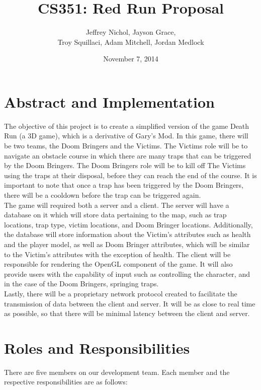 \documentclass[12pt, a4paper, oneside]{article}
\begin{document}
\title{CS351: Red Run Proposal}
\author{Jeffrey Nichol, Jayson Grace, \\
Troy Squillaci, Adam Mitchell, Jordan Medlock}
\date{November 7, 2014}
\maketitle

\section*{Abstract and Implementation}

The objective of this project is to create a simplified version of the game Death Run (a 3D game), which is a derivative of Gary's Mod. In this game, there will be two teams, the Doom Bringers and the Victims. The Victims role will be to navigate an obstacle course in which there are many traps that can be triggered by the Doom Bringers. The Doom Bringers role will be to kill off The Victims using the traps at their disposal, before they can reach the end of the course. It is important to note that once a trap has been triggered by the Doom Bringers, there will be a cooldown before the trap can be triggered again. \\

The game will required both a server and a client. The server will have a database on it which will store data pertaining to the map, such as trap locations, trap type, victim locations, and Doom Bringer locations. Additionally, the database will store information about the Victim's attributes such as health and the player model, as well as Doom Bringer attributes, which will be similar to the Victim's attributes with the exception of health. The client will be responsible for rendering the OpenGL component of the game. It will also provide users with the capability of input such as controlling the character, and in the case of the Doom Bringers, springing traps. \\

Lastly, there will be a proprietary network protocol created to facilitate the transmission of data between the client and server. It will be as close to real time as possible, so that there will be minimal latency between the client and server.

\section*{Roles and Responsibilities}
There are five members on our development team. Each member and the respective responsibilities are as follows:
\end{document}
